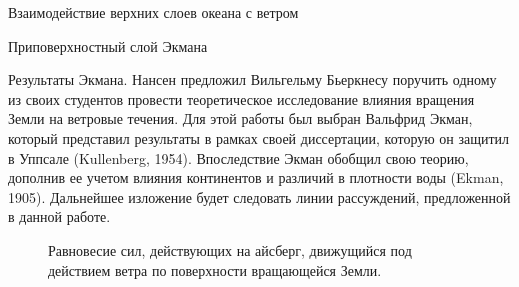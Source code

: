 \begin{chapter}{Взаимодействие верхних слоев океана с ветром}
\begin{section}{Приповерхностный слой Экмана}
\begin{paragraph}{Результаты Экмана.}
Нансен предложил Вильгельму Бьеркнесу поручить
одному из своих студентов провести теоретическое исследование влияния вращения
Земли на ветровые течения. Для этой работы был выбран Вальфрид Экман, который
представил результаты в рамках своей диссертации, которую он защитил 
в Уппсале (Kullenberg, 1954). Впоследствие Экман обобщил свою теорию, дополнив 
ее учетом влияния континентов и различий в плотности воды (Ekman, 1905). 
Дальнейшее изложение будет следовать линии рассуждений, предложенной 
в данной работе.
%

\begin{figure}[t!]
\centering
{}
\caption{Равновесие сил, действующих на айсберг, движущийся под действием
ветра по поверхности вращающейся Земли.}
\label{fig:forcesketch}
\vspace{-3ex}
\end{figure}
%
%


\end{paragraph}
\end{section}
\end{chapter}

